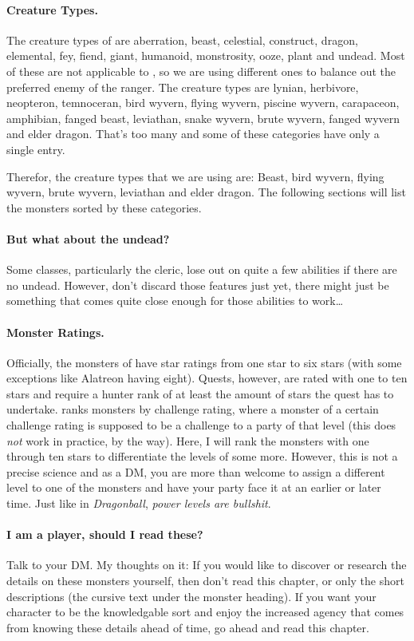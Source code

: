 \paragraph{Creature Types.} The creature types of \DND{} are aberration, beast, celestial, construct, dragon, elemental, fey, fiend, giant, humanoid, monstrosity, ooze, plant and undead. Most of these are not applicable to \MH{}, so we are using different ones to balance out the preferred enemy of the ranger. The \MH{} creature types are lynian, herbivore, neopteron, temnoceran, bird wyvern, flying wyvern, piscine wyvern, carapaceon, amphibian, fanged beast, leviathan, snake wyvern, brute wyvern, fanged wyvern and elder dragon. That's too many and some of these categories have only a single entry.

Therefor, the creature types that we are using are: Beast, bird wyvern, flying wyvern, brute wyvern, leviathan and elder dragon. The following sections will list the monsters sorted by these categories.

\paragraph{But what about the undead?} Some classes, particularly the cleric, lose out on quite a few abilities if there are no undead. However, don't discard those features just yet, there might just be something that comes quite close enough for those abilities to work\ldots

\paragraph{Monster Ratings.} Officially, the monsters of \MH{} have star ratings from one star to six stars (with some exceptions like Alatreon having eight). Quests, however, are rated with one to ten stars and require a hunter rank of at least the amount of stars the quest has to undertake. \DND{} ranks monsters by challenge rating, where a monster of a certain challenge rating is supposed to be a challenge to a party of that level (this does \emph{not} work in practice, by the way). Here, I will rank the monsters with one through ten stars to differentiate the levels of \MH{} some more. However, this is not a precise science and as a DM, you are more than welcome to assign a different level to one of the monsters and have your party face it at an earlier or later time. Just like in \emph{Dragonball}, \emph{power levels are bullshit}.

\paragraph{I am a player, should I read these?} Talk to your DM. My thoughts on it: If you would like to discover or research the details on these monsters yourself, then don't read this chapter, or only the short descriptions (the cursive text under the monster heading). If you want your character to be the knowledgable sort and enjoy the increased agency that comes from knowing these details ahead of time, go ahead and read this chapter.

